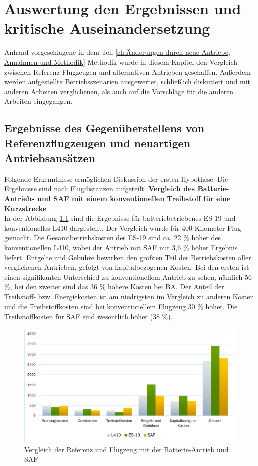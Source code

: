 \chapter{Auswertung den Ergebnissen und kritische Auseinandersetzung}
\label{ch:Auswertung den Ergebnissen}
Anhand vorgeschlagene in dem Teil \ref{ch:Änderungen durch neue Antriebe, Annahmen und Methodik} Methodik wurde in diesem 
Kapitel den Vergleich zwischen Referenz-Flugzeugen und alternativen Antrieben geschaffen.
Außerdem werden aufgestellte Betriebsszenarien ausgewertet, schließlich diskutiert und mit anderen Arbeiten verglichenen, als auch auf die
Vorschläge für die anderen Arbeiten eingegangen.

\section{Ergebnisse des Gegenüberstellens von Referenzflugzeugen und neuartigen Antriebsansätzen}
\label{s:Ergebnisse_Flugzeuge}
Folgende Erkenntnisse ermöglichen Diskussion der ersten Hypothese. Die Ergebnisse sind nach Flugdistanzen aufgeteilt.
%
\textbf{Vergleich des Batterie-Antriebs und SAF mit einem konventionellen Treibstoff für eine Kurzstrecke}\\
%
In der Abbildung \ref{vergleichBA_Ref} sind die Ergebnisse für batteriebetriebenes ES-19 und konventionelles L410 dargestellt.
Der Vergleich wurde für 400 Kilometer Flug gemacht.
%
Die Gesamtbetriebskosten des ES-19 sind ca. 22 \% höher des konventionellen L410, wobei der Antrieb mit SAF nur 3,6 \% höher
Ergebnis liefert. Entgelte und Gebühre bewirken den größten Teil der Betriebskosten
aller verglichenen Antrieben, gefolgt von kapitalbezogenen Kosten. Bei den ersten ist einen signifikanten Unterschied zu 
konventionellem Antrieb zu sehen, 
nämlich 56 \%, bei den zweiter sind das 36 \% höhere Kosten bei BA. Der Anteil der Treibstoff- bzw. Energiekosten ist am niedrigsten 
im Vergleich zu anderen Kosten und die Treibstoffkosten sind bei konventionellem Flugzeug 30 \% höher. Die Treibstoffkosten für SAF
sind wesentlich höher (38 \%).

\begin{figure}[h]
	\centering
	\includegraphics[width=0.9\linewidth]{Bilder/VergleichBA_Ref.png}
	\caption[Betriebskosten]{Vergleich der Referenz und Flugzeug mit der Batterie-Antrieb und SAF}
	\label{vergleichBA_Ref}
\end{figure}


